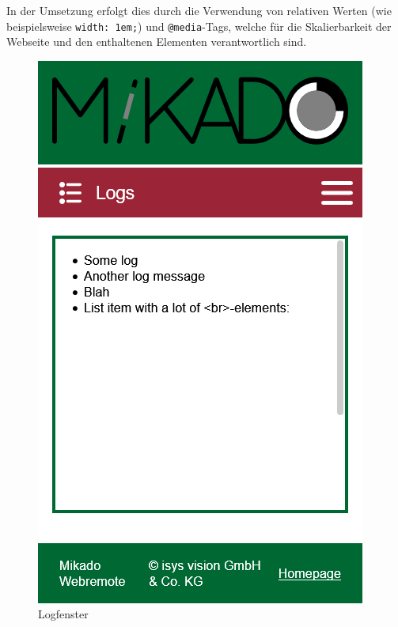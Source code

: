 In der Umsetzung erfolgt dies durch die Verwendung von relativen Werten (wie beispielsweise
\texttt{width: 1em;}) und \texttt{@media}-Tags, welche für die Skalierbarkeit der
Webseite und den enthaltenen Elementen verantwortlich sind.

\begin{figure}[H]
	\begin{center}
		\begin{minipage}{0.3\textwidth}
			\centering
			\includegraphics[width=\textwidth]{media/webremote-logs.png}
			\caption{Logfenster}
			\label{fig:webtools-remote-design-logfenster}
		\end{minipage}

\end{center}
\end{figure}
